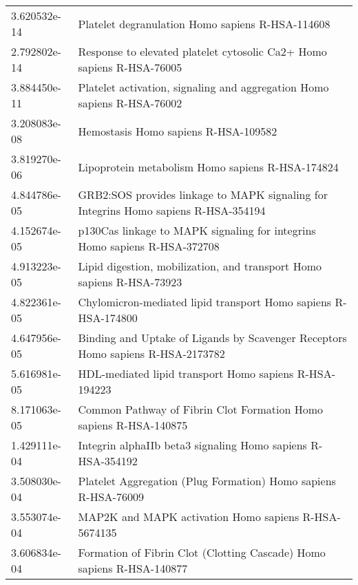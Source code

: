 \begin{longtable}{p{2.4cm}p{14.5cm}}
\bottomrule
\endlastfoot
             3.620532e-14 &                                              Platelet degranulation Homo sapiens R-HSA-114608 \\
             2.792802e-14 &                         Response to elevated platelet cytosolic Ca2+ Homo sapiens R-HSA-76005 \\
             3.884450e-11 &                       Platelet activation, signaling and aggregation Homo sapiens R-HSA-76002 \\
             3.208083e-08 &                                                          Hemostasis Homo sapiens R-HSA-109582 \\
             3.819270e-06 &                                              Lipoprotein metabolism Homo sapiens R-HSA-174824 \\
             4.844786e-05 &           GRB2:SOS provides linkage to MAPK signaling for Integrins Homo sapiens R-HSA-354194 \\
             4.152674e-05 &                     p130Cas linkage to MAPK signaling for integrins Homo sapiens R-HSA-372708 \\
             4.913223e-05 &                         Lipid digestion, mobilization, and transport Homo sapiens R-HSA-73923 \\
             4.822361e-05 &                                Chylomicron-mediated lipid transport Homo sapiens R-HSA-174800 \\
             4.647956e-05 &               Binding and Uptake of Ligands by Scavenger Receptors Homo sapiens R-HSA-2173782 \\
             5.616981e-05 &                                        HDL-mediated lipid transport Homo sapiens R-HSA-194223 \\
             8.171063e-05 &                             Common Pathway of Fibrin Clot Formation Homo sapiens R-HSA-140875 \\
             1.429111e-04 &                                   Integrin alphaIIb beta3 signaling Homo sapiens R-HSA-354192 \\
             3.508030e-04 &                                Platelet Aggregation (Plug Formation) Homo sapiens R-HSA-76009 \\
             3.553074e-04 &                                          MAP2K and MAPK activation Homo sapiens R-HSA-5674135 \\
             3.606834e-04 &                         Formation of Fibrin Clot (Clotting Cascade) Homo sapiens R-HSA-140877 \\

\end{longtable}
